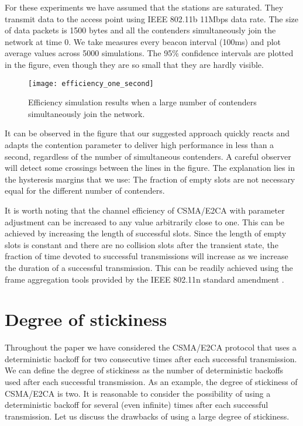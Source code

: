 \documentclass[journal]{IEEEtran}
\begin{document}
For these experiments we have assumed that the stations are saturated. They transmit data to the access point using IEEE 802.11b 11Mbps data rate. The size of data packets is 1500 bytes and all the contenders simultaneously join the network at time 0. We take measures every beacon interval (100ms) and plot average values across 5000 simulations. The 95\% confidence intervals are plotted in the figure, even though they are so small that they are hardly visible.

\begin{figure}[!t]
\centering
\texttt{[image: efficiency\_one\_second]}
\caption{Efficiency simulation results when a large number of contenders simultaneously join the network.}
\label{fig:efficiency_one_second}
\end{figure}

It can be observed in the figure that our suggested approach quickly reacts and adapts the contention parameter to deliver high performance in less than a second, regardless of the number of simultaneous contenders. A careful observer will detect some crossings between the lines in the figure. The explanation lies in the hysteresis margins that we use: The fraction of empty slots are not necessary equal for the different number of contenders.

It is worth noting that the channel efficiency of CSMA/E2CA with parameter adjustment can be increased to any value arbitrarily close to one. This can be achieved by increasing the length of successful slots. Since the length of empty slots is constant and there are no collision slots after the transient state, the fraction of time devoted to successful transmissions will increase as we increase the duration of a successful transmission. This can be readily achieved using the frame aggregation tools provided by the IEEE 802.11n standard amendment \cite{IEEE80211n-IEEESTD2009}.

\section{Degree of stickiness}
\label{sec:stickiness}
Throughout the paper we have considered the CSMA/E2CA protocol that uses a deterministic backoff for two consecutive times after each successful transmission. We can define the degree of stickiness as the number of deterministic backoffs used after each successful transmission. As an example, the degree of stickiness of CSMA/E2CA is two. It is reasonable to consider the possibility of using a deterministic backoff for several (even infinite) times after each successful transmission. Let us discuss the drawbacks of using a large degree of stickiness. 
\end{document}
